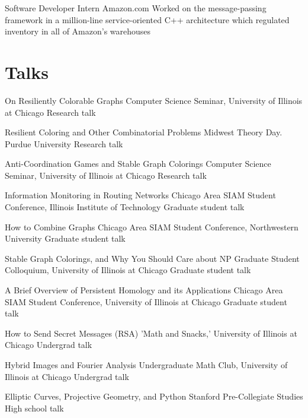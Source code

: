 \documentclass[11pt]{moderncv}
\begin{document}
         {Software Developer Intern}
      {Amazon.com}
      {}
      {}
      {Worked on the message-passing framework in a million-line service-oriented C++ architecture which regulated inventory in all of Amazon's warehouses}


   \section{Talks}
         {On Resiliently Colorable Graphs}
      {Computer Science Seminar, University of Illinois at Chicago}
      {Research talk}
      {}
{}

         {Resilient Coloring and Other Combinatorial Problems}
      {Midwest Theory Day. Purdue University}
      {Research talk}
      {}
{}

         {Anti-Coordination Games and Stable Graph Colorings}
      {Computer Science Seminar, University of Illinois at Chicago}
      {Research talk}
      {}
{}

         {Information Monitoring in Routing Networks}
      {Chicago Area SIAM Student Conference, Illinois Institute of Technology}
      {Graduate student talk}
      {}
{}

         {How to Combine Graphs}
      {Chicago Area SIAM Student Conference, Northwestern University}
      {Graduate student talk}
      {}
{}

         {Stable Graph Colorings, and Why You Should Care about NP}
      {Graduate Student Colloquium, University of Illinois at Chicago}
      {Graduate student talk}
      {}
{}

         {A Brief Overview of Persistent Homology and its Applications}
      {Chicago Area SIAM Student Conference, University of Illinois at Chicago}
      {Graduate student talk}
      {}
{}

         {How to Send Secret Messages (RSA)}
      {'Math and Snacks,' University of Illinois at Chicago}
      {Undergrad talk}
      {}
{}

         {Hybrid Images and Fourier Analysis}
      {Undergraduate Math Club, University of Illinois at Chicago}
      {Undergrad talk}
      {}
{}

         {Elliptic Curves, Projective Geometry, and Python}
      {Stanford Pre-Collegiate Studies}
      {High school talk}
      {}
{}
\end{document}
